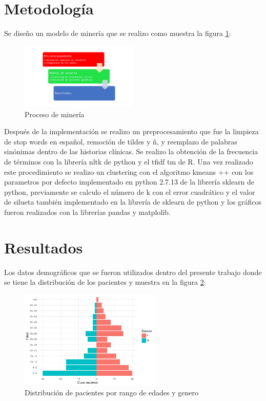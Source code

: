 \section{Metodología}

Se diseño un modelo de minería que se realizo como muestra la figura \ref{fig:mineria}:

\begin{figure}[H]
	\centering
	\includegraphics[width=0.5\textwidth]{Kap4/pipelinemineria}
	\caption{Proceso de minería} \label{fig:mineria}
\end{figure} 

Después de la implementación se realizo un preprocesamiento que fue la limpieza de stop words en español, remoción de tildes y ñ, y reemplazo de palabras sinónimas dentro de las historias clínicas. Se realizo la obtención de la frecuencia de términos con la librería nltk de python y el tfidf tm de R. Una vez realizado este procedimiento se realizo un clustering con el algoritmo kmeans ++  con los parametros por defecto implementado en python 2.7.13 de la librería sklearn de python, previamente se calculo el número de k con el error cuadrático y el valor de silueta también implementado en la librería de sklearn de python y los gráficos fueron realizados con la librerías pandas y matplolib.
 
\section{Resultados}

Los datos demográficos que se fueron utilizados dentro del presente trabajo donde se tiene la distribución de los pacientes y  muestra en la figura \ref{fig:demografia}:   

\begin{figure}[H]
	\centering
	\includegraphics[width=0.6\textwidth]{Kap4/general.pdf}
	\caption{Distribución de pacientes por rango de edades y genero} \label{fig:demografia}
\end{figure} 


